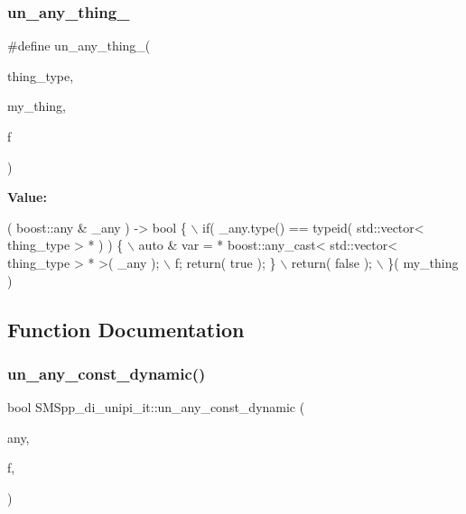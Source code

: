 \subsubsection{\texorpdfstring{un\+\_\+any\+\_\+thing\+\_}{un\_any\_thing\_1}}
{\footnotesize\ttfamily \#define un\+\_\+any\+\_\+thing\+\_(\begin{DoxyParamCaption}\item[{}]{thing\+\_\+type,  }\item[{}]{my\+\_\+thing,  }\item[{}]{f }\end{DoxyParamCaption})}

{\bfseries Value\+:}
\begin{DoxyCode}
[&]( boost::any & \_any ) -> \textcolor{keywordtype}{bool} \{ \(\backslash\)
  if( \_any.type() == \textcolor{keyword}{typeid}( std::vector< thing\_type > * ) ) \{ \(\backslash\)
   auto & var = * boost::any\_cast< std::vector< thing\_type > * >( \_any ); \(\backslash\)
   f; \textcolor{keywordflow}{return}( \textcolor{keyword}{true} ); \} \(\backslash\)
  return( \textcolor{keyword}{false} ); \(\backslash\)
  \}( my\_thing )
\end{DoxyCode}


\subsection{Function Documentation}
\mbox{\label{group__boost__any__stuff_ga4bf31c5fd006a3483e0d5311259bd9e8}} 
\subsubsection{\texorpdfstring{un\+\_\+any\+\_\+const\+\_\+dynamic()}{un\_any\_const\_dynamic()}}
{\footnotesize\ttfamily bool S\+M\+Spp\+\_\+di\+\_\+unipi\+\_\+it\+::un\+\_\+any\+\_\+const\+\_\+dynamic (\begin{DoxyParamCaption}\item[{const boost\+::any \&}]{any,  }\item[{F}]{f,  }\item[{\mbox{\hyperlink{struct_s_m_spp__di__unipi__it_1_1un__any__type}{un\+\_\+any\+\_\+type}}$<$ T $>$}]{ }\end{DoxyParamCaption})}


